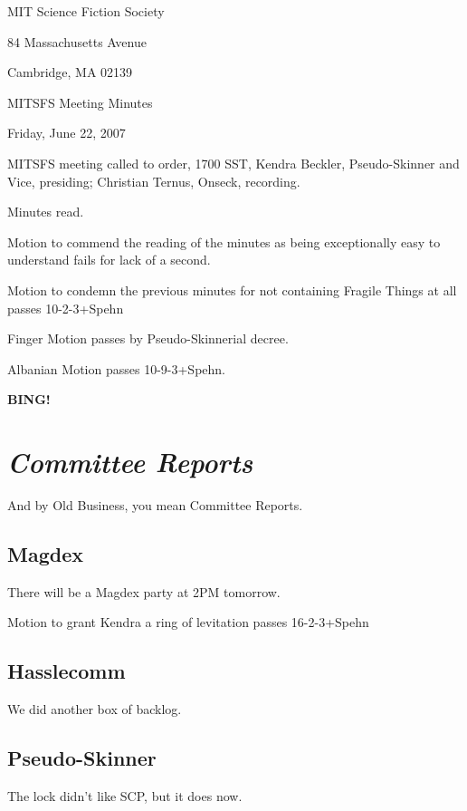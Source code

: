 \documentclass[10pt]{article}
\newcommand{\bing}{{\bf BING!} }
\newcommand{\goto}[1]{\bing \vskip 12pt \section*{{\em{#1}}}}
\begin{document}
\begin{center}

MIT Science Fiction Society

84 Massachusetts Avenue

Cambridge, MA 02139

\vspace{12pt}

MITSFS Meeting Minutes

Friday, June 22, 2007

\end{center}

\vspace{18pt}

\setlength{\parskip}{6pt}

\noindent
MITSFS meeting called to order, 1700 SST,
Kendra Beckler, Pseudo-Skinner and Vice, presiding; Christian Ternus, Onseck, recording.

Minutes read.

Motion to commend the reading of the minutes as being exceptionally easy to understand fails for lack of a second.

Motion to condemn the previous minutes for not containing Fragile Things at all passes 10-2-3+Spehn

Finger Motion passes by Pseudo-Skinnerial decree.

Albanian Motion passes 10-9-3+Spehn. 

\goto{Committee Reports}

And by Old Business, you mean Committee Reports.

\subsection*{Magdex}

There will be a Magdex party at 2PM tomorrow.

Motion to grant Kendra a ring of levitation passes 16-2-3+Spehn

\subsection*{Hasslecomm}

We did another box of backlog.

\subsection*{Pseudo-Skinner}

The lock didn't like SCP, but it does now.
\end{document}
